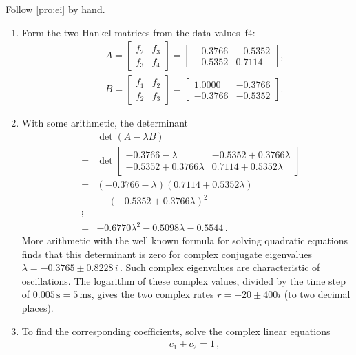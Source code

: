 \begin{example}
\begin{solution} 
Follow \autoref{pro:ei} by hand. 
\begin{enumerate}
\item 
Form the two Hankel matrices from the data values~\hlist f4:
\begin{eqnarray*}&&
A=\begin{bmatrix} f_2&f_3\\f_3&f_4 \end{bmatrix}
=\begin{bmatrix} -0.3766 & -0.5352
\\  -0.5352&   0.7114 \end{bmatrix},
\\&&
B=\begin{bmatrix} f_1&f_2\\f_2&f_3 \end{bmatrix}
=\begin{bmatrix} 1.0000&  -0.3766
\\  -0.3766&  -0.5352 \end{bmatrix}.
\end{eqnarray*}
\item 
With some arithmetic, the determinant 
\begin{eqnarray*}
&&\det(A-\lambda B)
\\&=&\det\begin{bmatrix} -0.3766-\lambda & -0.5352+0.3766\lambda
\\  -0.5352+0.3766\lambda&   0.7114+0.5352\lambda \end{bmatrix} 
\\&=&(-0.3766-\lambda)(0.7114+0.5352\lambda)
\\&&{}
-(-0.5352+0.3766\lambda)^2
\\&\vdots& 
\\&=& -0.6770\lambda^2  -0.5098\lambda  -0.5544\,.
\end{eqnarray*}
More arithmetic with the well known formula for solving quadratic equations finds that this determinant is zero for complex conjugate eigenvalues \(\lambda=-0.3765 \pm 0.8228\,i\)\,.
Such complex eigenvalues are characteristic of oscillations.
The logarithm of these complex values, divided by the time step of \(0.005\,\text{s}=5\,\)ms, gives the two complex rates \(r=-20\pm400i\) (to two decimal places).
\item 
To find the corresponding coefficients, solve the complex linear equations
\begin{eqnarray*}&&
c_1+c_2=1\,, 
\\&&

\end{eqnarray*}
\end{enumerate}
\end{solution}
\end{example}
